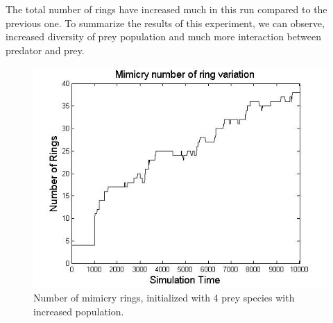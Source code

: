 The total number of rings have increased much in this run compared to the previous one. To summarize the results of this experiment, we can observe, increased diversity of prey population and much more interaction between predator and prey.

\begin{figure}[H]
	\centering
	\includegraphics[scale=0.40]{images/ringSize10k-4MorePrey}
	\caption[Number of mimicry rings (4 prey species, increased population)]{Number of mimicry rings, initialized with 4 prey species with increased population.}
	\label{fig:ringSize10k-4MorePrey}
\end{figure}

